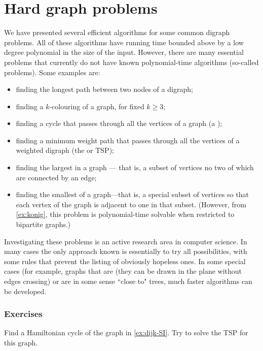 \chapter{Hard graph problems}%
\label{sec:hardgraph}
We have presented several efficient algorithms for some common digraph
problems. All of these algorithms have running time bounded above by a low
degree polynomial in the size of the input. However, there are many
essential problems that currently do not have known polynomial-time
algorithms (so-called  problems). Some examples
are:
\begin{itemize}
\item finding the longest path between two nodes of
a digraph;
\item finding a $k$-colouring of a graph, for fixed $k\geq
3$;
\item finding a cycle that passes through all the vertices of
a graph (a );
\item finding a
minimum weight path that passes through all the vertices of a weighted
digraph (the  or TSP);
\item finding the largest  in a graph --- that is, 
a subset of vertices no two of which are connected by an edge;
\item finding the smallest 
 of a graph---that is, a special subset of
vertices so that each vertex of the graph is adjacent to one in that
subset. (However, from \cref{ex:konig}, this problem 
is polynomial-time solvable when restricted to bipartite graphs.)

\end{itemize}

Investigating these problems is an active research area in computer
science. In many cases the only approach known is essentially to try
all possibilities, with some rules that prevent the listing of obviously
hopeless ones. In some special cases (for example, graphs that are 
 (they can be drawn in the plane without edges crossing) 
or are in some sense ``close to" trees, much faster algorithms can be developed.

\subsection*{Exercises}

\begin{Exercise}\label{exr:tsp}
Find a Hamiltonian cycle of the graph in \cref{ex:dijk-SI}. Try to solve
the TSP for this graph.
\end{Exercise}

